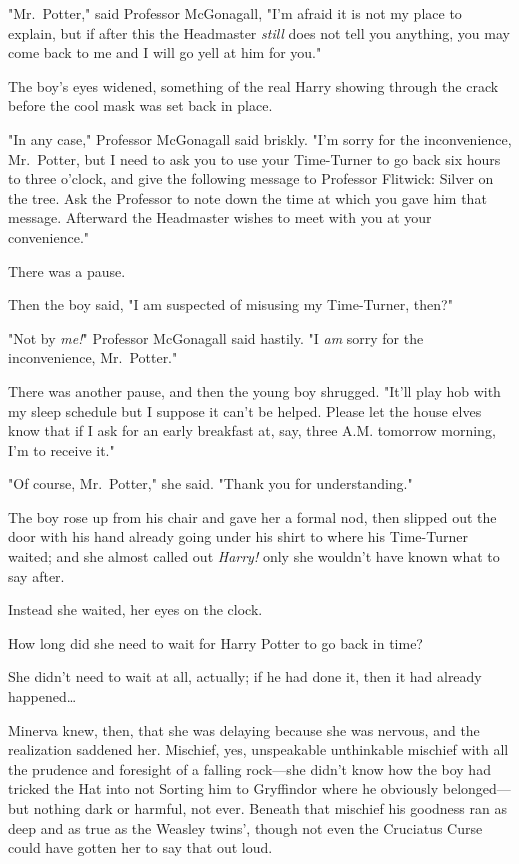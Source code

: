 "Mr.~Potter," said Professor McGonagall, "I'm afraid it is not my place to
explain, but if after this the Headmaster \emph{still} does not tell you
anything, you may come back to me and I will go yell at him for you."

The boy's eyes widened, something of the real Harry showing through the crack
before the cool mask was set back in place.

"In any case," Professor McGonagall said briskly. "I'm sorry for the
inconvenience, Mr.~Potter, but I need to ask you to use your Time-Turner to go
back six hours to three o'clock, and give the following message to Professor
Flitwick: Silver on the tree. Ask the Professor to note down the time at which
you gave him that message. Afterward the Headmaster wishes to meet with you at
your convenience."

There was a pause.

Then the boy said, "I am suspected of misusing my Time-Turner, then?"

"Not by \emph{me!}" Professor McGonagall said hastily. "I \emph{am} sorry for
the inconvenience, Mr.~Potter."

There was another pause, and then the young boy shrugged. "It'll play hob with
my sleep schedule but I suppose it can't be helped. Please let the house elves
know that if I ask for an early breakfast at, say, three A.M. tomorrow morning,
I'm to receive it."

"Of course, Mr.~Potter," she said. "Thank you for understanding."

The boy rose up from his chair and gave her a formal nod, then slipped out the
door with his hand already going under his shirt to where his Time-Turner
waited; and she almost called out \emph{Harry!} only she wouldn't have known
what to say after.

Instead she waited, her eyes on the clock.

How long did she need to wait for Harry Potter to go back in time?

She didn't need to wait at all, actually; if he had done it, then it had
already happened{\ldots}

Minerva knew, then, that she was delaying because she was nervous, and the
realization saddened her. Mischief, yes, unspeakable unthinkable mischief with
all the prudence and foresight of a falling rock---she didn't know how the boy
had tricked the Hat into not Sorting him to Gryffindor where he obviously
belonged---but nothing dark or harmful, not ever. Beneath that mischief his
goodness ran as deep and as true as the Weasley twins', though not even the
Cruciatus Curse could have gotten her to say that out loud.

